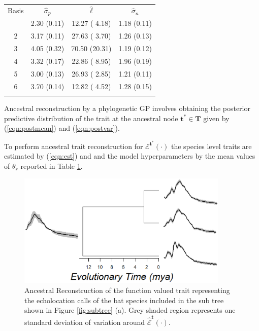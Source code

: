 \documentclass{ws-rv9x6}
\begin{document}
\begin{table}[ht]
	{
		\begin{tabular}{@{}cccc@{}} \toprule
			Basis & \(\hat{\sigma}_p\) & \(\hat{\ell}\) & \(\hat{\sigma}_n\) \\
			\colrule
			1 & 2.30 (0.11) & 12.27 ( 4.18) & 1.18 (0.11) \\
			2 & 3.17 (0.11) & 27.63 ( 3.70) & 1.26 (0.13) \\
			3 & 4.05 (0.32) & 70.50 (20.31) & 1.19 (0.12) \\
			4 & 3.32 (0.17) & 22.86 ( 8.95) & 1.96 (0.19) \\
			5 & 3.00 (0.13) & 26.93 ( 2.85) & 1.21 (0.11) \\
			6 & 3.70 (0.14) & 12.82 ( 4.52) & 1.28 (0.15) \\
			\botrule
		\end{tabular}
	}
	\label{tab::bat_results}
\end{table}

Ancestral reconstruction by a phylogenetic GP involves obtaining the posterior predictive distribution of the trait at the ancestral node \(\mathbf{t}^* \in \mathbf{T}\) given by (\ref{eqn:postmean}) and (\ref{eqn:postvar}).

To perform ancestral trait reconstruction for \(\mathcal{E}^{\mathbf{t}^*}(\cdot)\) the species level traits are estimated by (\ref{eqn:est}) and and the model hyperparameters by the mean values of \(\theta_r\) reported in Table \ref{tab::bat_results}.

\begin{figure}[h]
	\centering
	\includegraphics[width = 0.9\textwidth]{../Figures/ancrec.eps}
	\caption{Ancestral Reconstruction of the function valued trait representing the echolocation calls of the bat species included in the sub tree shown in Figure  \ref{fig:subtree} (a). Grey shaded region represents one standard deviation of variation around \(\hat{\mathcal{E}}^{\mathbf{t}}(\cdot)\).}
\end{figure}
\end{document}
